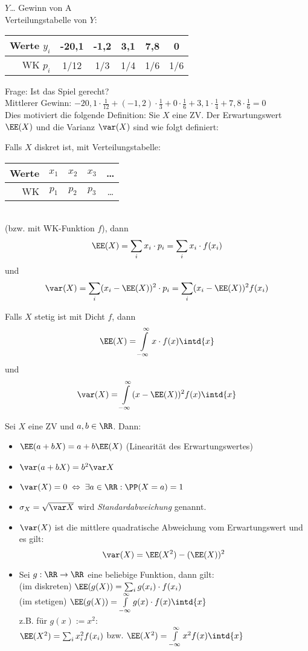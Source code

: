$Y$… Gewinn von A\\
Verteilungstabelle von $Y$:\\
\begin{tabular}{r | c | c | c | c | c}
Werte $y_i$ & -20,1 & -1,2 & 3,1 & 7,8 & 0\\\hline 
WK $p_i$ & 1/12 & 1/3 & 1/4 & 1/6 & 1/6
\end{tabular}

Frage: Ist das Spiel gerecht?\\
Mittlerer Gewinn: $-20,1 \cdot \frac{1}{12} + (-1,2) \cdot \frac{1}{3}+ 0\cdot \frac{1}{6} + 3,1 \cdot \frac{1}{4} + 7,8 \cdot \frac{1}{6} = 0$\\
Dies motiviert die folgende Definition:
 Sie $X$ eine ZV. Der Erwartungswert $\EE(X)$ und die Varianz $\var(X)$ sind wie folgt definiert:
\begin{anumerate}
\item Falls $X$ diskret ist, mit Verteilungstabelle:\\
\begin{tabular}{r | c c c c}
Werte & $x_1$ & $x_2$ & $x_3$ & …\\\hline
WK & $p_1$ & $p_2$ & $p_3$ & …
\end{tabular}\\
(bzw. mit WK-Funktion $f$), dann 
$$\EE(X) = \sum_i x_i \cdot p_i = \sum_i x_i \cdot f(x_i)$$
und
$$\var(X)=\sum_i (x_i - \EE(X))^2 \cdot p_i = \sum_i (x_i - \EE(X))^2 f(x_i)$$
\item Falls $X$ stetig ist mit Dicht $f$, dann
$$\EE(X) = \int\limits_{-\infty}^{\infty} x\cdot f(x) \intd{x}$$
und 
$$\var (X) = \int\limits_{-\infty}^{\infty} (x-\EE(X))^2 f(x) \intd{x}$$
\end{anumerate}

 Sei $X$ eine ZV und $a, b \in \RR$. Dann:
\begin{itemize}
\item $\EE(a+bX)=a+b\EE(X)$ \tab (Linearität des Erwartungswertes)
\item $\var(a+bX) = b^2 \var X$
\item $\var(X)=0 \;\Leftrightarrow\; \exists a \in \RR: \PP(X=a) =1$
\end{itemize}

\begin{itemize}
\item $\sigma_X=\sqrt{\var X}$ wird \emph{Standardabweichung} genannt.
\item $\var (X)$ ist die mittlere quadratische Abweichung vom Erwartungswert und es gilt:
$$\var (X) = \EE(X^2) - (\EE(X))^2$$
\item Sei $g: \RR \to \RR$ eine beliebige Funktion, dann gilt: \\
(im diskreten) \tab\tab $\EE(g(X))=\sum_i g(x_i) \cdot f(x_i)$\bigskip\\
(im stetigen) \tab\tab $\EE(g(X))=\int\limits_{-\infty}^{\infty} g(x) \cdot f(x) \intd{x}$\\
z.B. für $g(x):=x^2$:\\
$\EE(X^2) = \sum_i x_i^2 f(x_i)$ bzw. $\EE(X^2) = \int\limits_{-\infty}^{\infty}x^2 f(x) \intd{x}$
\end{itemize}

